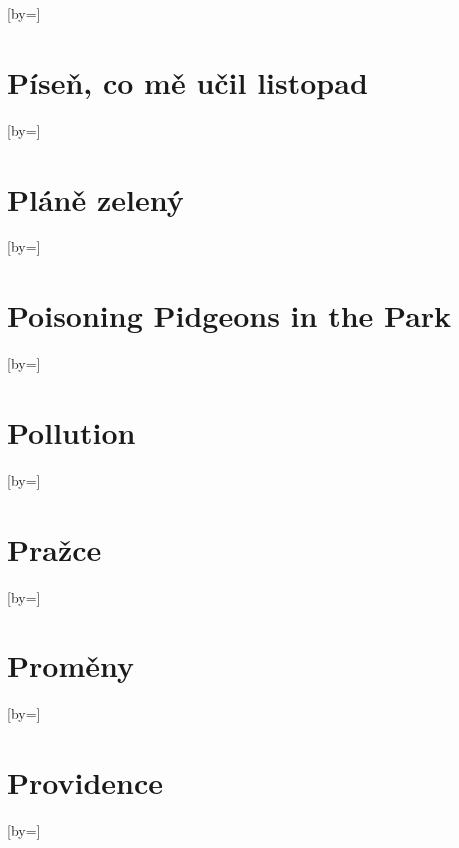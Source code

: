 \documentclass{article}
\begin{document}
\begin{songs}{}
\begin{song}{}[by={}]
\endverse
\end{song}

\section{Píseň, co mě učil listopad}
\begin{song}{}[by={}]
\beginverse

\endverse
\end{song}

\section{Pláně zelený}
\begin{song}{}[by={}]
\beginverse

\endverse
\end{song}

\section{Poisoning Pidgeons in the Park}
\begin{song}{}[by={}]
\beginverse

\endverse
\end{song}

\section{Pollution}
\begin{song}{}[by={}]
\beginverse

\endverse
\end{song}

\section{Pražce}
\begin{song}{}[by={}]
\beginverse

\endverse
\end{song}

\section{Proměny}
\begin{song}{}[by={}]
\beginverse

\endverse
\end{song}

\section{Providence}
\begin{song}{}[by={}]
\beginverse


\end{song}
\end{songs}
\end{document}
